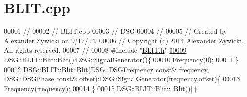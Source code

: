 \hypertarget{_b_l_i_t_8cpp_source}{\section{B\+L\+I\+T.\+cpp}
\label{_b_l_i_t_8cpp_source}
}

\begin{DoxyCode}
00001 \textcolor{comment}{//}
00002 \textcolor{comment}{//  BLIT.cpp}
00003 \textcolor{comment}{//  DSG}
00004 \textcolor{comment}{//}
00005 \textcolor{comment}{//  Created by Alexander Zywicki on 9/17/14.}
00006 \textcolor{comment}{//  Copyright (c) 2014 Alexander Zywicki. All rights reserved.}
00007 \textcolor{comment}{//}
00008 \textcolor{preprocessor}{#include "\hyperlink{_b_l_i_t_8h}{BLIT.h}"}
\hypertarget{_b_l_i_t_8cpp_source_l00009}{}\hyperlink{class_d_s_g_1_1_b_l_i_t_1_1_blit_a1d9bed6285a8b3c0e073f3e3662716af}{00009} \hyperlink{class_d_s_g_1_1_b_l_i_t_1_1_blit_a1d9bed6285a8b3c0e073f3e3662716af}{DSG::BLIT::Blit::Blit}():\hyperlink{namespace_d_s_g}{DSG}::\hyperlink{class_d_s_g_1_1_signal_generator}{SignalGenerator}()\{
00010     \hyperlink{class_d_s_g_1_1_signal_generator_a4e6b3c43e76e53f8cd337ad699c464cb}{Frequency}(0);
00011 \}
\hypertarget{_b_l_i_t_8cpp_source_l00012}{}\hyperlink{class_d_s_g_1_1_b_l_i_t_1_1_blit_a8ab0fb1b908d641527bb86a81d1722ba}{00012} \hyperlink{class_d_s_g_1_1_b_l_i_t_1_1_blit_a1d9bed6285a8b3c0e073f3e3662716af}{DSG::BLIT::Blit::Blit}(\hyperlink{namespace_d_s_g_a4315a061386fa1014fda09b15d3a6973}{DSG::DSGFrequency} \textcolor{keyword}{const}& frequency,
      \hyperlink{namespace_d_s_g_a44431ce1eb0a7300efdd207bc879e52c}{DSG::DSGPhase} \textcolor{keyword}{const}& offset):\hyperlink{namespace_d_s_g}{DSG}::\hyperlink{class_d_s_g_1_1_signal_generator}{SignalGenerator}(frequency,offset)\{
00013     \hyperlink{class_d_s_g_1_1_signal_generator_a4e6b3c43e76e53f8cd337ad699c464cb}{Frequency}(frequency);
00014 \}
\hypertarget{_b_l_i_t_8cpp_source_l00015}{}\hyperlink{class_d_s_g_1_1_b_l_i_t_1_1_blit_a92da2e1763735b3e17f7b9a24377f988}{00015} \hyperlink{class_d_s_g_1_1_b_l_i_t_1_1_blit_a92da2e1763735b3e17f7b9a24377f988}{DSG::BLIT::Blit::~Blit}()\{\}
\end{DoxyCode}
